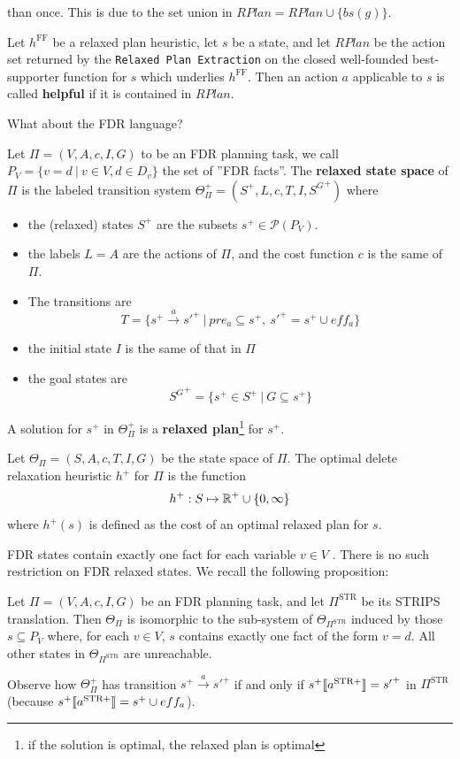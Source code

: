 \documentclass[10pt, letterpaper]{report}
\begin{document}
 than once. This is due to the set union in $RPlan=RPlan\cup\{bs(g)\}$.
\begin{definition}
Let $h^{\text{FF}}$ be a relaxed plan heuristic, let $s$ be a state, and let $RPlan$ be the action set returned by the \texttt{Relaxed Plan Extraction}  on the closed well-founded best-supporter function for $s$ which underlies $h^{\text{FF}}$. Then an action $a$ applicable to $s$ is called \textbf{helpful} if it is contained in $RPlan$.
\end{definition}
What about the FDR language?\begin{definition}
    Let $\Pi=(V,A,c,I,G)$ to be an FDR planning task, we call $P_V=\{v=d \ | \ v\in V,d\in D_v\}$ the set of ''FDR facts''. The \textbf{relaxed state space} of $\Pi$ is the labeled transition system $\Theta_\Pi^+=(S^+,L,c,T,I,{S^{G}}^+)$ where\begin{itemize}
        \item the (relaxed) states $S^+$ are the subsets $s^+\in \mathcal P(P_V)$.
        \item the labels $L=A$ are the actions of $\Pi$, and the cost function $c$ is the same of $\Pi$.
        \item The transitions are $$T=\{s^+\xrightarrow{a}{s'}^+ \ | \ pre_a\subseteq s^+, \ {s'}^+=s^+\cup eff_a\} $$
        \item the initial state $I$ is the same of that in $\Pi$
        \item the goal states are $${S^{G}}^+=\{s^+ \in S^+ \ | \ G\subseteq s^+\} $$
    \end{itemize}
\end{definition}
A solution for $s^+$ in $\Theta_\Pi^+$ is a \textbf{relaxed plan}\footnote{if the solution is optimal, the relaxed plan is optimal} for $s^+$.

Let $\Theta_\Pi=(S,A,c,T,I,G)$ be the state space of $\Pi$. The optimal delete
 relaxation heuristic $h^+$ for $\Pi$ is the function $$h^+:S\mapsto {\mathbb R}^+\cup\{0,\infty\} $$ where $h^+(s)$ is defined as the cost of an optimal relaxed plan for $s$.

FDR states contain exactly one fact for each variable $v\in V$ . There is no such restriction on FDR relaxed states. We recall the following proposition:
\begin{proposition}
Let $\Pi = (V, A, c, I, G)$ be an FDR planning task, and let $\Pi^{\text{STR}}$ be its STRIPS translation. Then $\Theta_{\Pi}$ is isomorphic to the sub-system of $\Theta_{\Pi^{\text{STR}}}$ induced by those $s \subseteq P_{V}$ where, for each $v \in V$, $s$ contains exactly one fact of the form $v = d$. All other states in $\Theta_{\Pi^{\text{STR}}}$ are unreachable.
\end{proposition}
Observe how $\Theta_\Pi^+$ has transition $s^+\xrightarrow{a}{s'}^+$ if and only if $s^+\llbracket a^{\text{STR}+} \rrbracket={s'}^+$ in $\Pi^{\text{STR}}$ (because $s^+\llbracket a^{\text{STR}+} \rrbracket=s^+\cup eff_a$).
\end{document}
